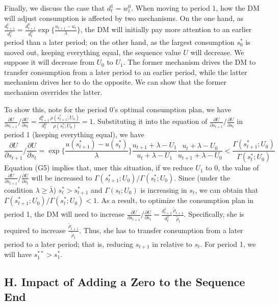 Finally, we discuss the case that \(d_t^1=w_t^0\). When moving to period
1, how the DM will adjust consumption is affected by two mechanisms. On
the one hand, as
\(\frac{d_{t+1}^1}{d_t^1}=\frac{d_{t+1}^0}{d_t^0}\exp\{\frac{u_{t+1}-u_t}{\lambda}\}\),
the DM will initially pay more attention to an earlier period than a
later period; on the other hand, as the largest consumption \(s_0^*\) is
moved out, keeping everything equal, the sequence value \(U\) will
decrease. We suppose it will decrease from \(U_0\) to \(U_1\). The
former mechanism drives the DM to transfer consumption from a later
period to an earlier period, while the latter mechanism drives her to do
the opposite. We can show that the former mechanism overrides the
latter.

To show this, note for the period 0's optimal consumption plan, we have
\(\frac{\partial U}{\partial s_{t+1}}/\frac{\partial U}{\partial s_{t}}=\frac{d_{t+1}^0}{d_t^0}\frac{\rho(s_{t+1}^*;U_0)}{\rho(s_t^*;U_0)}=1\).
Substituting it into the equation of
\(\frac{\partial U}{\partial s_{t+1}}/\frac{\partial U}{\partial s_{t}}\)
in period 1 (keeping everything equal), we have\[
\tag{G5}
\frac{\partial U}{\partial s_{t+1}}/\frac{\partial U}{\partial s_{t}}
= \exp\{\frac{u(s_{t+1}^*)-u(s_t^*)}{\lambda}\}\frac{u_{t+1}+\lambda-U_1}{u_t+\lambda-U_1}
\frac{u_t+\lambda-U_0}{u_{t+1}+\lambda-U_0}<\frac{\Gamma(s_{t+1}^*;U_0)}{\Gamma(s_{t}^*;U_0)}
\]Equation (G5) implies that, uner this situation, if we reduce \(U_1\)
to 0, the value of
\(\frac{\partial U}{\partial s_{t+1}}/\frac{\partial U}{\partial s_{t}}\)
will be increased to \(\Gamma(s_{t+1}^*;U_0)/\Gamma(s_t^*;U_0)\). Since
(under the condition \(\lambda \geq \bar{\lambda}\)) \(s_t^*>s_{t+1}^*\)
and \(\Gamma(s_t;U_0)\) is increasing in \(s_t\), we can obtain that
\(\Gamma(s_{t+1}^*;U_0)/\Gamma(s_t^*;U_0)<1\). As a result, to optimize
the consumption plan in period 1, the DM will need to increase
\(\frac{\partial U}{\partial s_{t+1}}/\frac{\partial U}{\partial s_{t}}=\frac{d_{t+1}^1}{d_t^1}\frac{\tilde{\rho}_{t+1}}{\tilde{\rho}_t}\).
Specifically, she is required to increase
\(\frac{\tilde{\rho}_{t+1}}{\tilde{\rho}_t}\). Thus, she has to transfer
consumption from a later period to a later period; that is, reducing
\(s_{t+1}\) in relative to \(s_t\). For period 1, we will have
\(s_1^{**}>s_1^*\).

\hypertarget{h.-impact-of-adding-a-zero-to-the-sequence-end}{%
\subsection*{H. Impact of Adding a Zero to the Sequence
End}\label{h.-impact-of-adding-a-zero-to-the-sequence-end}}


